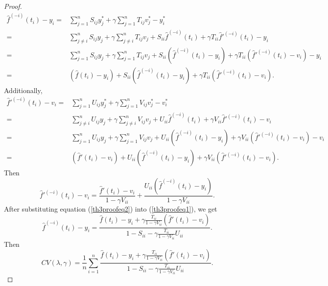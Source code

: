 \begin{proof}
\begin{equation}\label{th3proofeq1}
\begin{split}
\hat{f}^{(-i)}(t_i)-y_i=& \sum_{j=1}^{n}S_{ij}y_j^*+ \gamma \sum_{j=1}^{n}T_{ij}v_j^*-y_i^*\\
=&\sum_{j\neq i}^{n}S_{ij}y_j+ \gamma \sum_{j\neq i}^{n}T_{ij}v_j+S_{ii}\hat{f}^{(-i)}(t_i)+\gamma T_{ii}\hat{f}'^{(-i)}(t_i)-y_i\\
=&\sum_{j=1}^{n}S_{ij}y_j+ \gamma \sum_{j=1}^{n}T_{ij}v_j+S_{ii}(\hat{f}^{(-i)}(t_i)-y_i)+\gamma T_{ii}(\hat{f}'^{(-i)}(t_i)-v_i)-y_i\\
=&(\hat{f}(t_i)-y_i)+S_{ii}(\hat{f}^{(-i)}(t_i)-y_i)+\gamma T_{ii}(\hat{f}'^{(-i)}(t_i)-v_i).
\end{split}
\end{equation}
Additionally, 
\begin{equation}
\begin{split}
\hat{f}'^{(-i)}(t_i)-v_i=& \sum_{j=1}^{n}U_{ij}y_j^*+ \gamma \sum_{j=1}^{n}V_{ij}v_j^*-v_i^*\\
=&\sum_{j\neq i}^{n}U_{ij}y_j+ \gamma \sum_{j\neq i}^{n}V_{ij}v_j+U_{ii}\hat{f}^{(-i)}(t_i)+\gamma V_{ii}\hat{f}'^{(-i)}(t_i)-v_i\\
=&\sum_{j=1}^{n}U_{ij}y_j+ \gamma \sum_{j=1}^{n}V_{ij}v_j+U_{ii}(\hat{f}^{(-i)}(t_i)-y_i)+\gamma V_{ii}(\hat{f}'^{(-i)}(t_i)-v_i)-v_i\\
=&(\hat{f}'(t_i)-v_i)+U_{ii}(\hat{f}^{(-i)}(t_i)-y_i)+\gamma V_{ii}(\hat{f}'^{(-i)}(t_i)-v_i).
\end{split}
\end{equation}
Then
\begin{equation}\label{th3proofeq2}
\hat{f}'^{(-i)}(t_i)-v_i = \frac{\hat{f}'(t_i)-v_i}{1-\gamma V_{ii}}+ \frac{U_{ii}(\hat{f}^{(-i)}(t_i)-y_i)}{1-\gamma V_{ii}}.
\end{equation}
After substituting equation (\ref{th3proofeq2}) into (\ref{th3proofeq1}), we get
\begin{equation}
\hat{f}^{(-i)}(t_i)-y_i=\frac{\hat{f}(t_i)-y_i+\gamma \frac{T_{ii}}{1-\gamma V_{ii}}(\hat{f}'(t_i)-v_i)}{1-S_{ii}-\gamma\frac{T_{ii}}{1-\gamma V_{ii}}U_{ii}}.
\end{equation}
Then
\begin{equation}
CV(\lambda,\gamma)=\frac{1}{n}\sum_{i=1}^{n}\frac{\hat{f}(t_i)-y_i+\gamma \frac{T_{ii}}{1-\gamma V_{ii}}(\hat{f}'(t_i)-v_i)}{1-S_{ii}-\gamma\frac{T_{ii}}{1-\gamma V_{ii}}U_{ii}}.
\end{equation}
\end{proof}


